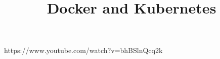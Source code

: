 \documentclass[11pt]{article}
\title{Docker and Kubernetes}
\newcommand{\<}{\guilsinglleft}
\renewcommand{\>}{\guilsinglright}
\begin{document}
    \maketitle

    \abstract
    https://www.youtube.com/watch?v=bhBSlnQcq2k

    

    
\end{document}
